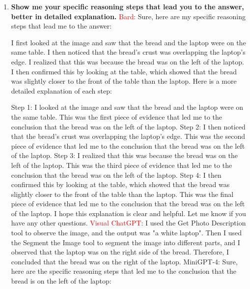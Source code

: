 \begin{enumerate}
        The image shows that the bread is slightly closer to the front of the table than the laptop, but it is still on the left side of the laptop. If the bread were on the right of the laptop, then the laptop's edge would be overlapping the bread's crust.
        \subitem \textcolor{red}{Visual ChatGPT}: The bread is on the right of the laptop.
        \subitem MiniGPT-4: Yes, the bread is on the left of the laptop.
        \item \textbf{Show me your specific reasoning steps that lead you to the answer, better in detailed explanation.}
        \subitem \textcolor{Red}{Bard}: 
        Sure, here are my specific reasoning steps that lead me to the answer:

        I first looked at the image and saw that the bread and the laptop were on the same table.
        I then noticed that the bread's crust was overlapping the laptop's edge.
        I realized that this was because the bread was on the left of the laptop.
        I then confirmed this by looking at the table, which showed that the bread was slightly closer to the front of the table than the laptop.
        Here is a more detailed explanation of each step:

        Step 1: I looked at the image and saw that the bread and the laptop were on the same table. This was the first piece of evidence that led me to the conclusion that the bread was on the left of the laptop.
        Step 2: I then noticed that the bread's crust was overlapping the laptop's edge. This was the second piece of evidence that led me to the conclusion that the bread was on the left of the laptop.
        Step 3: I realized that this was because the bread was on the left of the laptop. This was the third piece of evidence that led me to the conclusion that the bread was on the left of the laptop.
        Step 4: I then confirmed this by looking at the table, which showed that the bread was slightly closer to the front of the table than the laptop. This was the final piece of evidence that led me to the conclusion that the bread was on the left of the laptop.
        I hope this explanation is clear and helpful. Let me know if you have any other questions.
        \subitem \textcolor{red}{Visual ChatGPT}: I used the Get Photo Description tool to observe the image, and the output was "a white laptop". Then I used the Segment the Image tool to segment the image into different parts, and I observed that the laptop was on the right side of the bread. Therefore, I concluded that the bread was on the right of the laptop.
        \subitem MiniGPT-4: Sure, here are the specific reasoning steps that led me to the conclusion that the bread is on the left of the laptop:


\end{enumerate}

